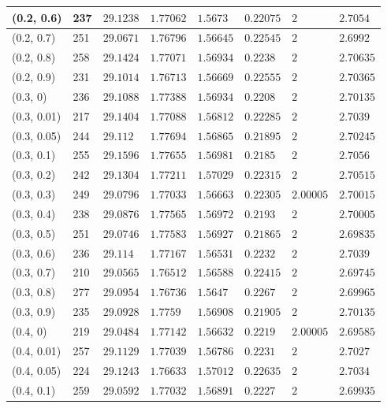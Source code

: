 \begin{center}
{\begin{longtable}{| l | p{} |  p{} | p{} | p{} | p{} | p{} | p{} |}
 (0.2, 0.6) & 237  & $29.1238$ & $1.77062$ & $1.5673$ & $0.22075$ & $2$ & $2.7054$ \\ \hline
 (0.2, 0.7) & 251  & $29.0671$ & $1.76796$ & $1.56645$ & $0.22545$ & $2$ & $2.6992$ \\ \hline
 (0.2, 0.8) & 258  & $29.1424$ & $1.77071$ & $1.56934$ & $0.2238$ & $2$ & $2.70635$ \\ \hline
 (0.2, 0.9) & 231  & $29.1014$ & $1.76713$ & $1.56669$ & $0.22555$ & $2$ & $2.70365$ \\ \hline
 (0.3, 0) & 236  & $29.1088$ & $1.77388$ & $1.56934$ & $0.2208$ & $2$ & $2.70135$ \\ \hline
 (0.3, 0.01) & 217  & $29.1404$ & $1.77088$ & $1.56812$ & $0.22285$ & $2$ & $2.7039$ \\ \hline
 (0.3, 0.05) & 244  & $29.112$ & $1.77694$ & $1.56865$ & $0.21895$ & $2$ & $2.70245$ \\ \hline
 (0.3, 0.1) & 255  & $29.1596$ & $1.77655$ & $1.56981$ & $0.2185$ & $2$ & $2.7056$ \\ \hline
 (0.3, 0.2) & 242  & $29.1304$ & $1.77211$ & $1.57029$ & $0.22315$ & $2$ & $2.70515$ \\ \hline
 (0.3, 0.3) & 249  & $29.0796$ & $1.77033$ & $1.56663$ & $0.22305$ & $2.00005$ & $2.70015$ \\ \hline
 (0.3, 0.4) & 238  & $29.0876$ & $1.77565$ & $1.56972$ & $0.2193$ & $2$ & $2.70005$ \\ \hline
 (0.3, 0.5) & 251  & $29.0746$ & $1.77583$ & $1.56927$ & $0.21865$ & $2$ & $2.69835$ \\ \hline
 (0.3, 0.6) & 236  & $29.114$ & $1.77167$ & $1.56531$ & $0.2232$ & $2$ & $2.7039$ \\ \hline
 (0.3, 0.7) & 210  & $29.0565$ & $1.76512$ & $1.56588$ & $0.22415$ & $2$ & $2.69745$ \\ \hline
 (0.3, 0.8) & 277  & $29.0954$ & $1.76736$ & $1.5647$ & $0.2267$ & $2$ & $2.69965$ \\ \hline
 (0.3, 0.9) & 235  & $29.0928$ & $1.7759$ & $1.56908$ & $0.21905$ & $2$ & $2.70135$ \\ \hline
 (0.4, 0) & 219  & $29.0484$ & $1.77142$ & $1.56632$ & $0.2219$ & $2.00005$ & $2.69585$ \\ \hline
 (0.4, 0.01) & 257  & $29.1129$ & $1.77039$ & $1.56786$ & $0.2231$ & $2$ & $2.7027$ \\ \hline
 (0.4, 0.05) & 224  & $29.1243$ & $1.76633$ & $1.57012$ & $0.22635$ & $2$ & $2.7034$ \\ \hline
 (0.4, 0.1) & 259  & $29.0592$ & $1.77032$ & $1.56891$ & $0.2227$ & $2$ & $2.69935$ \\ \hline

\end{longtable}}
\end{center}
